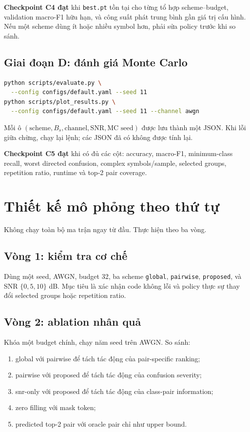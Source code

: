 \documentclass[11pt,journal,onecolumn]{IEEEtran}
\newcommand{\snr}{\mathrm{SNR}}
\begin{document}
\textbf{Checkpoint C4 đạt} khi \texttt{best.pt} tồn tại cho từng tổ hợp scheme--budget, validation macro-F1 hữu hạn, và công suất phát trung bình gần giá trị cấu hình. Nếu một scheme dùng ít hoặc nhiều symbol hơn, phải sửa policy trước khi so sánh.

\subsection{Giai đoạn D: đánh giá Monte Carlo}
\begin{lstlisting}[language=bash]
python scripts/evaluate.py \
  --config configs/default.yaml --seed 11
python scripts/plot_results.py \
  --config configs/default.yaml --seed 11 --channel awgn
\end{lstlisting}

Mỗi ô $(\text{scheme},B_s,\text{channel},\snr,\text{MC seed})$ được lưu thành một JSON. Khi lỗi giữa chừng, chạy lại lệnh; các JSON đã có không được tính lại.

\textbf{Checkpoint C5 đạt} khi có đủ các cột: accuracy, macro-F1, minimum-class recall, worst directed confusion, complex symbols/sample, selected groups, repetition ratio, runtime và top-2 pair coverage.

\section{Thiết kế mô phỏng theo thứ tự}
Không chạy toàn bộ ma trận ngay từ đầu. Thực hiện theo ba vòng.

\subsection{Vòng 1: kiểm tra cơ chế}
Dùng một seed, AWGN, budget 32, ba scheme \texttt{global}, \texttt{pairwise}, \texttt{proposed}, và SNR $\{0,5,10\}$ dB. Mục tiêu là xác nhận code không lỗi và policy thực sự thay đổi selected groups hoặc repetition ratio.

\subsection{Vòng 2: ablation nhân quả}
Khóa một budget chính, chạy năm seed trên AWGN. So sánh:
\begin{enumerate}
\item global với pairwise để tách tác động của pair-specific ranking;
\item pairwise với proposed để tách tác động của confusion severity;
\item snr-only với proposed để tách tác động của class-pair information;
\item zero filling với mask token;
\item predicted top-2 pair với oracle pair chỉ như upper bound.
\end{enumerate}
\end{document}

